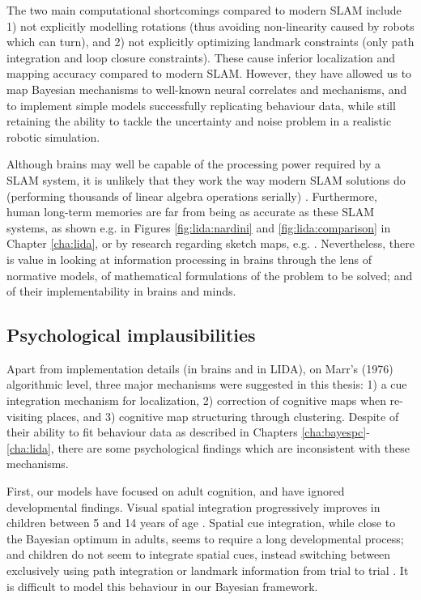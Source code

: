 The two main computational shortcomings compared to modern SLAM include 1) not explicitly modelling rotations (thus avoiding non-linearity caused by robots which can turn), and 2) not explicitly optimizing landmark constraints (only path integration and loop closure constraints). These cause inferior localization and mapping accuracy compared to modern SLAM. However, they have allowed us to map Bayesian mechanisms to well-known neural correlates and mechanisms, and to implement simple models successfully replicating behaviour data, while still retaining the ability to tackle the uncertainty and noise problem in a realistic robotic simulation.

Although brains may well be capable of the processing power required by a SLAM system, it is unlikely that they work the way modern SLAM solutions do (performing thousands of linear algebra operations serially) \citep{thrun2008simultaneous}. Furthermore, human long-term memories are far from being as accurate as these SLAM systems, as shown e.g. in Figures \ref{fig:lida:nardini} and \ref{fig:lida:comparison} in Chapter \ref{cha:lida}, or by research regarding sketch maps, e.g. \citep{rovine1989sketch, wang2009accuracy}. Nevertheless, there is value in looking at information processing in brains through the lens of normative models, of mathematical formulations of the problem to be solved; and of their implementability in brains and minds. 

\subsection{Psychological implausibilities}

Apart from implementation details (in brains and in LIDA), on Marr's (1976) algorithmic level, three major mechanisms were suggested in this thesis: 1) a cue integration mechanism for localization, 2) correction of cognitive maps when re-visiting places, and 3) cognitive map structuring through clustering. Despite of their ability to fit behaviour data as described in Chapters \ref{cha:bayespc}-\ref{cha:lida}, there are some psychological findings which are inconsistent with these mechanisms. 

First, our models have focused on adult cognition, and have ignored developmental findings. Visual spatial integration progressively improves in children between 5 and 14 years of age \citep{kovacs1999late}. Spatial cue integration, while close to the Bayesian optimum in adults, seems to require a long developmental process; and children do not seem to integrate spatial cues, instead switching between exclusively using path integration or landmark information from trial to trial \citep{nardini2008development}. It is difficult to model this behaviour in our Bayesian framework.

